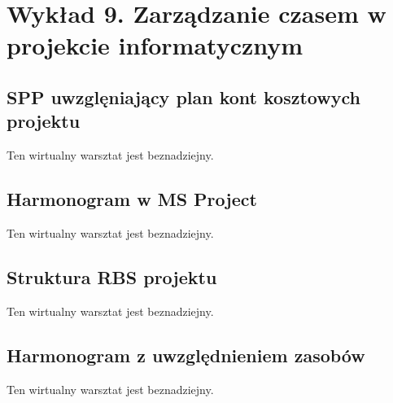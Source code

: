 \chapter{Wykład 9. Zarządzanie czasem w projekcie informatycznym}

\section{SPP uwzglęniający plan kont kosztowych projektu}

Ten wirtualny warsztat jest beznadziejny.


\section{Harmonogram w MS Project}

Ten wirtualny warsztat jest beznadziejny.


\section{Struktura RBS projektu}

Ten wirtualny warsztat jest beznadziejny.


\section{Harmonogram z uwzględnieniem zasobów}

Ten wirtualny warsztat jest beznadziejny.


